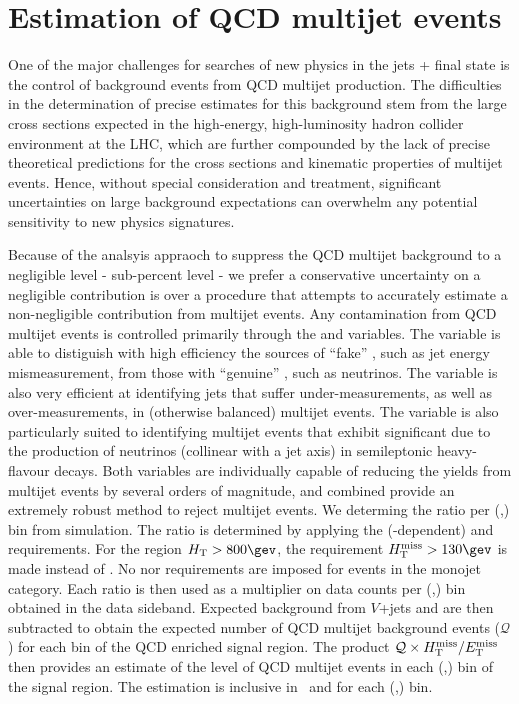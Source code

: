 \section{Estimation of QCD multijet events \label{sec:qcd}}

One of the major challenges for searches of new physics in the jets + \met final state is the control of background events from QCD multijet
production. The difficulties in the determination of precise estimates for this background stem from the large cross sections expected in the
high-energy, high-luminosity hadron collider environment at the LHC, which are further compounded by the lack of precise theoretical
predictions for the cross sections and kinematic properties of multijet events. Hence, without special consideration and treatment,
significant uncertainties on large background expectations can overwhelm any potential sensitivity to new physics signatures.


Because of the analsyis appraoch to suppress the QCD multijet background to a
negligible level -   sub-percent level -  we prefer a conservative uncertainty on a negligible contribution is
 over a procedure that attempts to accurately estimate a
non-negligible contribution from multijet events. 
Any contamination from QCD multijet events is controlled primarily through the \alphat and \bdphi variables. The \alphat variable is able
to distiguish with high efficiency the sources of ``fake'' \met, such as jet energy mismeasurement, from those with ``genuine'' \met, such
as neutrinos. The \bdphi variable is also very efficient at identifying jets that suffer under-measurements, as well as
over-measurements, in (otherwise balanced) multijet events. The variable is also particularly suited to identifying multijet events
that exhibit significant \met due to the production of neutrinos (collinear with a jet axis) in semileptonic heavy-flavour decays. Both
variables are individually capable of reducing the yields from multijet events by several orders of magnitude, and combined provide
an extremely robust method to reject multijet events. 
We determing the ratio \rmhtmet per (\njet,\scalht) bin from simulation. The ratio is determined by applying the (\scalht-dependent)
\alphat and \bdphi requirements. For the region $\scalht > 800\gev$, the requirement $\mht > 130\gev$ is made instead of \alphat. 
No \alphat nor \mht requirements are imposed for events in the monojet category.
Each ratio \rmhtmet is then used as a multiplier on data counts per (\njet,\scalht) bin obtained in the
\mhtmet data sideband. Expected background from $V$+jets and \ttbar are then subtracted to obtain the expected number of 
QCD multijet background events ($\mathcal{Q}$) for each bin of the QCD enriched signal region.
The product $\mathcal{Q} \times \mbox{$\mbox{$H_{\rm T}^{\rm miss}$} / \mbox{$E_\text{T}^{\rm miss}$}$}$ then provides an estimate of the level of QCD multijet events in
each (\njet,\scalht) bin of the signal region. The estimation is inclusive in \nb\ and \mht for each
(\njet,\scalht) bin. 



